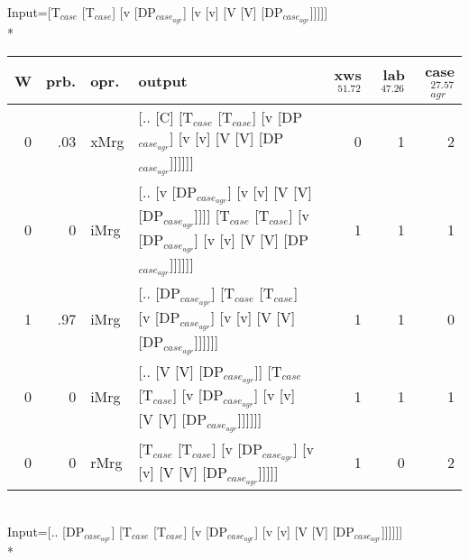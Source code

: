 \begingroup\scriptsize Input=[T$_{case}$ [T$_{case}$] [v [DP$_{case_{agr}}$] [v [v] [V [V] [DP$_{case_{agr}}$]]]]]\\*
\begin{tabularx}{\linewidth}{rrlXrrr}
\hline
   W &   prb. & opr.   & output                                                                                                                 &   xws$^{51.72}$ &   lab$^{47.26}$ &   case$_{agr}^{27.57}$ \\
\hline
   0 &   .03 & xMrg & [.. [C] [T$_{case}$ [T$_{case}$] [v [DP$_{case_{agr}}$] [v [v] [V [V] [DP$_{case_{agr}}$]]]]]]                                             &             0 &             1 &                  2 \\
   0 &   0 & iMrg & [.. [v [DP$_{case_{agr}}$] [v [v] [V [V] [DP$_{case_{agr}}$]]]] [T$_{case}$ [T$_{case}$] [v [DP$_{case_{agr}}$] [v [v] [V [V] [DP$_{case_{agr}}$]]]]]] &             1 &             1 &                  1 \\
   1 &   .97 & iMrg & [.. [DP$_{case_{agr}}$] [T$_{case}$ [T$_{case}$] [v [DP$_{case_{agr}}$] [v [v] [V [V] [DP$_{case_{agr}}$]]]]]]                                   &             1 &             1 &                  0 \\
   0 &   0 & iMrg & [.. [V [V] [DP$_{case_{agr}}$]] [T$_{case}$ [T$_{case}$] [v [DP$_{case_{agr}}$] [v [v] [V [V] [DP$_{case_{agr}}$]]]]]]                           &             1 &             1 &                  1 \\
   0 &   0 & rMrg & [T$_{case}$ [T$_{case}$] [v [DP$_{case_{agr}}$] [v [v] [V [V] [DP$_{case_{agr}}$]]]]]                                                      &             1 &             0 &                  2 \\
\hline
\end{tabularx}\endgroup\\
\begingroup\scriptsize Input=[.. [DP$_{case_{agr}}$] [T$_{case}$ [T$_{case}$] [v [DP$_{case_{agr}}$] [v [v] [V [V] [DP$_{case_{agr}}$]]]]]]\\*
